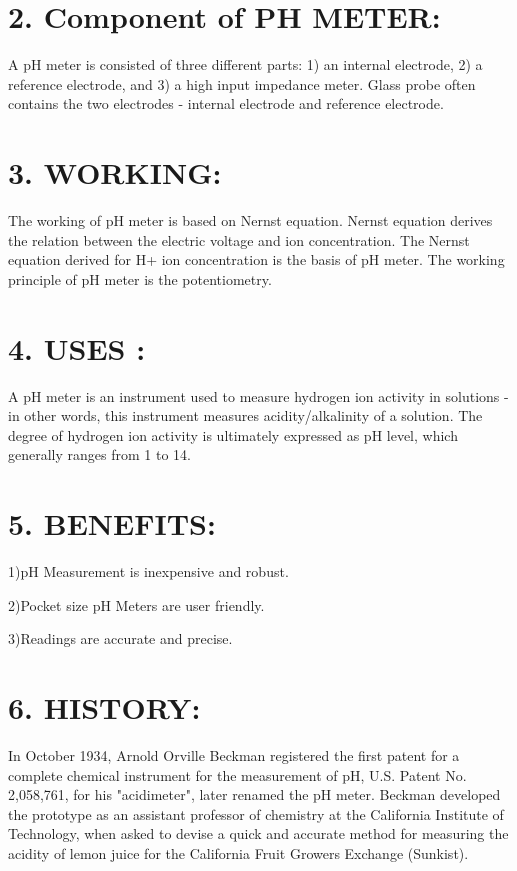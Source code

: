 \documentclass[12pt]{article}
\begin{document}
\section*{2. Component of PH METER:}
 A pH meter is consisted of three different parts: 1) an internal electrode, 2) a reference electrode, and 3) a high input impedance meter. Glass probe often contains the two electrodes - internal electrode and reference electrode.
 
 \section*{3. WORKING:}
   The working of pH meter is based on Nernst equation. Nernst equation derives the relation between the electric voltage and ion concentration. The Nernst equation derived for H+ ion concentration is the basis of pH meter. The working principle of pH meter is the potentiometry.
   
\section*{4.  USES :}
A pH meter is an instrument used to measure hydrogen ion activity in solutions - in other words, this instrument measures acidity/alkalinity of a solution. The degree of hydrogen ion activity is ultimately expressed as pH level, which generally ranges from 1 to 14.


\section*{5. BENEFITS:}
1)pH Measurement is inexpensive and robust.

 2)Pocket size pH Meters are user friendly.
 
 3)Readings are accurate and precise.
 
 \section*{6. HISTORY:}
 
 In October 1934, Arnold Orville Beckman registered the first patent for a complete chemical instrument for the measurement of pH, U.S. Patent No. 2,058,761, for his "acidimeter", later renamed the pH meter. Beckman developed the prototype as an assistant professor of chemistry at the California Institute of Technology, when asked to devise a quick and accurate method for measuring the acidity of lemon juice for the California Fruit Growers Exchange (Sunkist).
 
\end{document}
